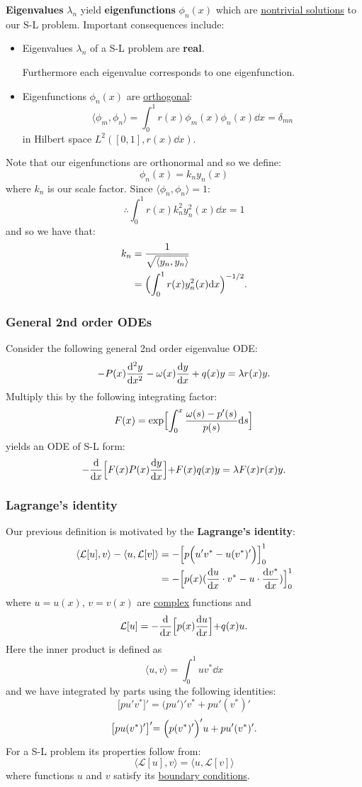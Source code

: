 \documentclass{article}
\begin{document}
\begin{multicols}{3}
\textbf{Eigenvalues} $\lambda_n$ yield \textbf{eigenfunctions} $\phi_n(x)$
which are \underline{nontrivial solutions} to our S-L problem. Important consequences include:
\begin{itemize}
    \item Eigenvalues $\lambda_n$ of a S-L problem are \textbf{real}. 
    
    Furthermore each eigenvalue corresponds to one eigenfunction.

    \item Eigenfunctions $\phi_n(x)$ are \underline{orthogonal}:
    $$\langle \phi_m,\phi_n \rangle
    =\int_{0}^{1}r(x)\phi_m(x)\phi_n(x) \dd x=\delta_{mn}$$
    in Hilbert space $L^2([0,1],r(x)\dd x)$.
\end{itemize}

Note that our eigenfunctions are orthonormal and so we define:
$$\phi_n(x)=k_n y_n(x)$$
where $k_n$ is our scale factor.
Since $\langle \phi_n,\phi_n \rangle=1$:
$$\therefore\int_{0}^{1}r(x)k_n^2y_n^2(x)\dd x=1$$
and so we have that:
\begin{align*}
    k_n
    &=\frac{1}{\sqrt{\langle y_n,y_n \rangle}} \\
    &=\Bigl(\int_{0}^{1}r(x)y_n^2(x)\dd x\Bigl)^{-1/2}.
\end{align*}

\subsubsection{General 2nd order ODEs}
Consider the following general 2nd order eigenvalue ODE:
$$-P(x)\dv[2]{y}{x}-\omega(x)\dv{y}{x}+q(x)y=\lambda r(x)y.$$
Multiply this by the following integrating factor:
$$F(x)=\exp\Bigl[\int_{0}^{x}
\frac{\omega(s)-p'(s)}{p(s)}\dd s\Bigl]$$
yields an ODE of S-L form:
$$-\dv{x}\Bigl[F(x)P(x)\dv{y}{x}\Bigl]
+F(x)q(x)y=\lambda F(x)r(x)y.$$

\subsubsection{Lagrange's identity}
Our previous definition is motivated by the \textbf{Lagrange's identity}:
\begin{align*}
    \langle \mathcal{L}[u], v \rangle - \langle u, \mathcal{L}[v] \rangle
    &=-\Bigl[p\Bigl(u'v^*-u(v^*)'\Bigl)\Bigl]_{0}^{1} \\
    &=-\Bigl[p(x)(\dv{u}{x}\cdot v^*-u\cdot\dv{v^*}{x})\Bigl]_{0}^{1}
\end{align*}
where $u=u(x)$, $v=v(x)$ are \underline{complex} functions and
$$\mathcal{L}[u]=-\dv{x}\Bigl[p(x)\dv{u}{x}\Bigl]+q(x)u.$$
Here the inner product is defined as
$$\langle u,v \rangle=\int_{0}^{1}uv^* \dd x$$
and we have integrated by parts using the following identities:
$$\bigl[pu'v^*\bigl]'=\bigl(pu'\bigl)'v^*+pu'(v^*)'$$
$$\bigl[pu(v^*)'\bigl]'=\Bigl(p(v^*)'\Bigl)'u+pu'(v^*)'.$$
For a S-L problem its properties follow from:
$$\langle \mathcal{L}[u], v \rangle=\langle u, \mathcal{L}[v] \rangle$$
where functions $u$ and $v$
satisfy its \underline{boundary conditions}.


\end{multicols}
\end{document}
